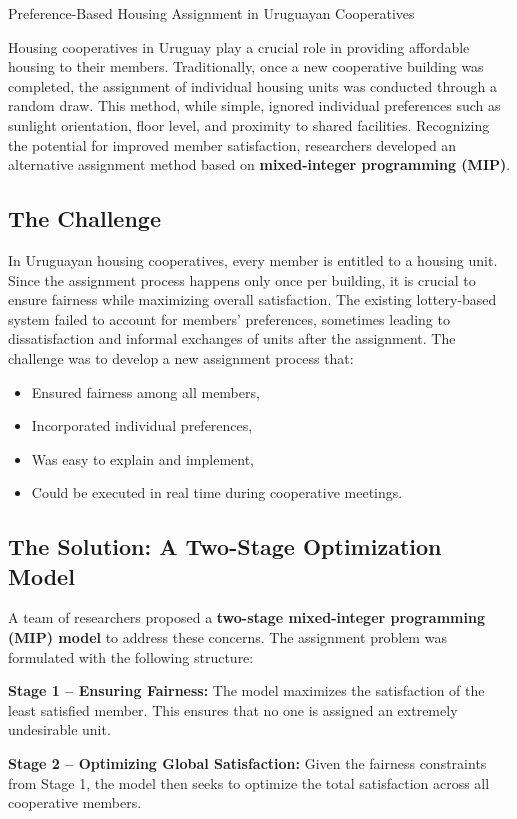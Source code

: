 \begin{casestudybox}{Preference-Based Housing Assignment in Uruguayan Cooperatives}
\label{case:housing-uruguay}

Housing cooperatives in Uruguay play a crucial role in providing affordable housing to their members. Traditionally, once a new cooperative building was completed, the assignment of individual housing units was conducted through a random draw. This method, while simple, ignored individual preferences such as sunlight orientation, floor level, and proximity to shared facilities. Recognizing the potential for improved member satisfaction, researchers developed an alternative assignment method based on \textbf{mixed-integer programming (MIP)}.

\subsection*{The Challenge}
In Uruguayan housing cooperatives, every member is entitled to a housing unit. Since the assignment process happens only once per building, it is crucial to ensure fairness while maximizing overall satisfaction. The existing lottery-based system failed to account for members' preferences, sometimes leading to dissatisfaction and informal exchanges of units after the assignment. The challenge was to develop a new assignment process that:
\begin{itemize}
    \item Ensured fairness among all members,
    \item Incorporated individual preferences,
    \item Was easy to explain and implement,
    \item Could be executed in real time during cooperative meetings.
\end{itemize}

\subsection*{The Solution: A Two-Stage Optimization Model}
A team of researchers proposed a \textbf{two-stage mixed-integer programming (MIP) model} to address these concerns. The assignment problem was formulated with the following structure:

\textbf{Stage 1 – Ensuring Fairness:} The model maximizes the satisfaction of the least satisfied member. This ensures that no one is assigned an extremely undesirable unit.

\textbf{Stage 2 – Optimizing Global Satisfaction:} Given the fairness constraints from Stage 1, the model then seeks to optimize the total satisfaction across all cooperative members.


\end{casestudybox}
